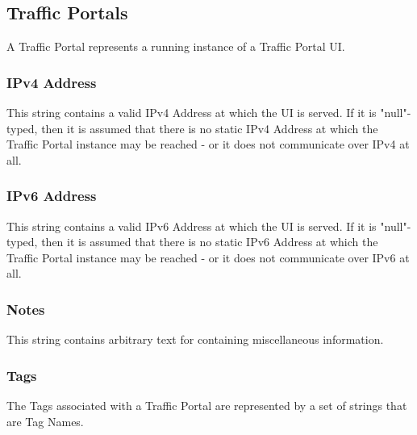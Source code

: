 %
%

\subsection{Traffic Portals}
A Traffic Portal represents a running instance of a Traffic Portal UI.

\subsubsection{IPv4 Address}
This string contains a valid IPv4 Address at which the UI is served. If it is
"null"-typed, then it is assumed that there is no static IPv4 Address at which
the Traffic Portal instance may be reached - or it does not communicate over
IPv4 at all.

\subsubsection{IPv6 Address}
This string contains a valid IPv6 Address at which the UI is served. If it is
"null"-typed, then it is assumed that there is no static IPv6 Address at which
the Traffic Portal instance may be reached - or it does not communicate over
IPv6 at all.

\subsubsection{Notes}
This string contains arbitrary text for containing miscellaneous information.

\subsubsection{Tags}
The Tags associated with a Traffic Portal are represented by a set of strings
that are Tag Names.

